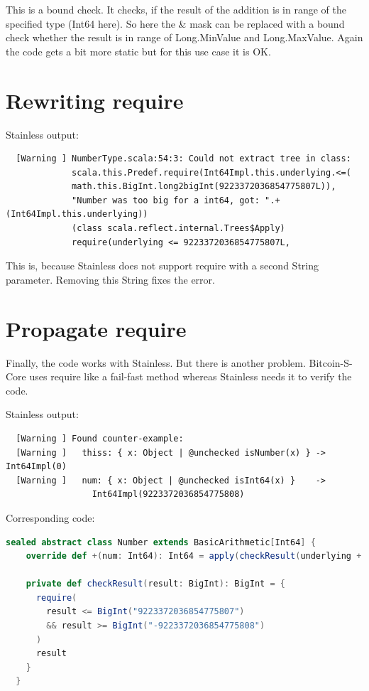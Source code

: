 This is a bound check.
It checks, if the result of the addition is in range of the specified type (Int64 here).
So here the \& mask can be replaced with a bound check whether the result is in range of Long.MinValue and Long.MaxValue.
Again the code gets a bit more static but for this use case it is OK.


\section{Rewriting require}
Stainless output:
\begin{verbatim}
  [Warning ] NumberType.scala:54:3: Could not extract tree in class:
             scala.this.Predef.require(Int64Impl.this.underlying.<=(
             math.this.BigInt.long2bigInt(9223372036854775807L)),
             "Number was too big for a int64, got: ".+(Int64Impl.this.underlying))
             (class scala.reflect.internal.Trees$Apply)
             require(underlying <= 9223372036854775807L,
\end{verbatim}

This is, because Stainless does not support require with a second String parameter.
Removing this String fixes the error.

\section{Propagate require}
Finally, the code works with Stainless.
But there is another problem.
Bitcoin-S-Core uses require like a fail-fast method whereas Stainless needs it to verify the code.

Stainless output:
\begin{verbatim}
  [Warning ] Found counter-example:
  [Warning ]   thiss: { x: Object | @unchecked isNumber(x) } -> Int64Impl(0)
  [Warning ]   num: { x: Object | @unchecked isInt64(x) }    -> 
                 Int64Impl(9223372036854775808)
\end{verbatim}

Corresponding code:
\begin{lstlisting}[language=scala]
  sealed abstract class Number extends BasicArithmetic[Int64] {
    override def +(num: Int64): Int64 = apply(checkResult(underlying + num.underlying))

    private def checkResult(result: BigInt): BigInt = {
      require(
        result <= BigInt("9223372036854775807")
        && result >= BigInt("-9223372036854775808")
      )
      result
    }
  }
\end{lstlisting}

